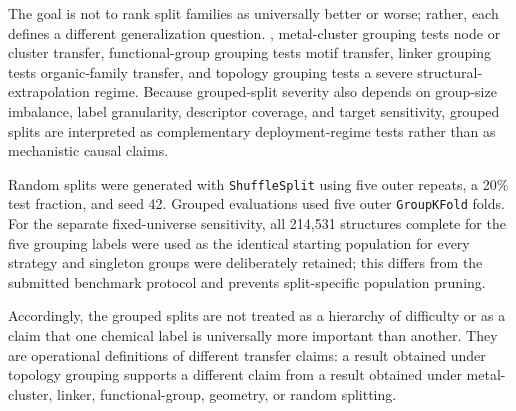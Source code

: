 \documentclass[11pt,a4paper]{article}
\newcommand{\del}[1]{}
\begin{document}
The goal is not to rank split families as universally better or worse; rather, each defines a different generalization question. \del{Geometry grouping tests pore-regime transfer}, metal-cluster grouping tests node or cluster transfer, functional-group grouping tests motif transfer, linker grouping tests organic-family transfer, and topology grouping tests a severe structural-extrapolation regime. Because grouped-split severity also depends on group-size imbalance, label granularity, descriptor coverage, and target sensitivity, grouped splits are interpreted as complementary deployment-regime tests rather than as mechanistic causal claims.

Random splits were generated with \texttt{ShuffleSplit} using five outer repeats, a 20\% test fraction, and seed 42. Grouped evaluations used five outer \texttt{GroupKFold} folds. For the separate fixed-universe sensitivity, all 214,531 structures complete for the five grouping labels were used as the identical starting population for every strategy and singleton groups were deliberately retained; this differs from the submitted benchmark protocol and prevents split-specific population pruning.


Accordingly, the grouped splits are not treated as a hierarchy of difficulty or as a claim that one chemical label is universally more important than another. They are operational definitions of different transfer claims: a result obtained under topology grouping supports a different claim from a result obtained under metal-cluster, linker, functional-group, geometry, or random splitting.
\end{document}
